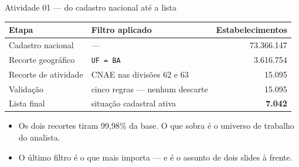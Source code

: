 \documentclass[aspectratio=169]{beamer}
\newcommand{\lidos}{73.366.147}
\newcommand{\naba}{3.616.754}
\newcommand{\recorte}{15.095}
\newcommand{\leads}{7.042}
\begin{document}
\begin{frame}{Atividade 01 --- do cadastro nacional até a lista}
    \begin{table}
        \small
        \begin{tabular}{llr}
            \toprule
            Etapa & Filtro aplicado & Estabelecimentos \\
            \midrule
            Cadastro nacional      & ---                                 & \lidos \\
            Recorte geográfico     & \texttt{UF = BA}                    & \naba \\
            Recorte de atividade   & CNAE nas divisões 62 e 63           & \recorte \\
            Validação              & cinco regras --- nenhum descarte    & \recorte \\
            Lista final            & situação cadastral ativa            & \textbf{\leads} \\
            \bottomrule
        \end{tabular}
    \end{table}

    \begin{itemize}
        \item Os dois recortes tiram 99,98\% da base. O que sobra é o universo
              de trabalho do analista.
        \item O último filtro é o que mais importa --- e é o assunto de dois
              slides à frente.
    \end{itemize}
\end{frame}
\end{document}
